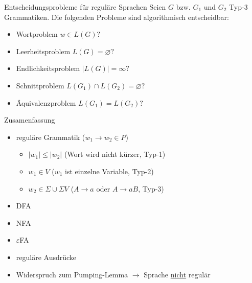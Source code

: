 \begin{frame}{Entscheidungsprobleme für reguläre Sprachen}
	Seien $G$ bzw. $G_1$ und $G_2$ Typ-3 Grammatiken. Die folgenden
	Probleme sind algorithmisch entscheidbar:
	\begin{itemize}
		\item Wortproblem $w \in L(G)?$
		\item Leerheitsproblem $L(G) = \varnothing?$
		\item Endlichkeitsproblem $|L(G)|=\infty ?$
		\item Schnittproblem $L(G_1) \cap L(G_2) = \varnothing ?$
		\item Äquivalenzproblem $L(G_1) = L(G_2)?$
	\end{itemize}
\end{frame}

\begin{frame}{Zusamenfassung}
	\begin{itemize}
		\item reguläre Grammatik ($w_1 \rightarrow w_2 \in P$)
		\begin{itemize}
			\item $|w_1|\leq|w_2|$ (Wort wird nicht kürzer, Typ-1)
			\item $w_1 \in V$ ($w_1$ ist einzelne Variable, Typ-2)
			\item $w_2 \in \Sigma \cup \Sigma V$ ($A \rightarrow a$ oder $A \rightarrow aB$, Typ-3)
		\end{itemize}
		\item DFA
		\item NFA
		\item $\varepsilon$FA
		\item reguläre Ausdrücke
		\item Widerspruch zum Pumping-Lemma $\rightarrow$ Sprache \underline{nicht} regulär
	\end{itemize}
\end{frame}
